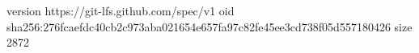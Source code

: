 version https://git-lfs.github.com/spec/v1
oid sha256:276fcaefdc40cb2c973aba021654e657fa97c82fe45ee3cd738f05d557180426
size 2872
